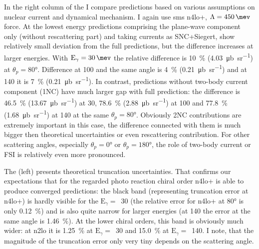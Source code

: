     
    In the right column of the  I compare predictions
    based on various assumptions on nuclear current and dynamical mechanism.
    I again use \gls{sms} \gls{n4lo+}, $\Lambda=\SI{450}{\mev}$ force.
    At the lowest energy predictions comprising the plane-wave component only (without rescattering part)
    and taking currents as SNC+Siegert, show relatively small deviation from the full predictions, but the difference increases at larger energies.
    With $\text{E}_\gamma=\SI{30}{\mev}$ the relative difference is \SI{10}{\percent} (\SI{4.03}{\micro \barn \per \steradian})
    at $\theta_p = \ang{80}$. Difference at \SI{100}{\mev} and the same angle is \SI{4}{\percent} (\SI{0.21}{\micro \barn \per \steradian})
    and at \SI{140}{\mev} it is \SI{7}{\percent} (\SI{0.21}{\micro \barn \per \steradian}).
    In contrast, predictions without two-body current component (1NC) have much larger gap with full prediction:
    the difference is \SI{46.5}{\percent} (\SI{13.67}{\micro \barn \per \steradian}) at \SI{30}{\mev},
    \SI{78.6}{\percent} (\SI{2.88}{\micro \barn \per \steradian}) at \SI{100}{\mev} and
    \SI{77.8}{\percent} (\SI{1.68}{\micro \barn \per \steradian}) at \SI{140}{\mev}
    at the same $\theta_p=\ang{80}$.
    Obviously 2NC contributions are extremely important in this case, the difference connected with them
    is much bigger then theoretical uncertainties or even rescattering contribution.
    For other scattering angles, especially $\theta_p=\ang{0}$ or $\theta_p=\ang{180}$,
    the role of two-body current or FSI is relatively even more pronounced.


    The  (left)
    presents theoretical truncation uncertainties.
    That confirms our expectations
    that for the regarded photo reaction chiral order
    \gls{n4lo+} is able to produce converged predictions: 
    the black band (representing truncation error at \gls{n4lo+}) is hardly visible
    for the $\text{E}_\gamma=$~\SI{30}{\mev}
    (the relative error for \gls{n4lo+} at \ang{80} is only \SI{0.12}{\percent})
    and is also quite narrow for larger energies (at \SI{140}{\mev} 
    the error at the same angle is \SI{1.46}{\percent}).
    At the lower chiral orders, this band is obviously much wider:
    at \gls{n2lo} it is \SI{1.25}{\percent} at $\text{E}_\gamma=$~\SI{30}{\mev}
    and \SI{15.0}{\percent} at $\text{E}_\gamma=$~\SI{140}{\mev}.
    I note, that the magnitude of the truncation error
    only very tiny depends on the scattering angle.
    

